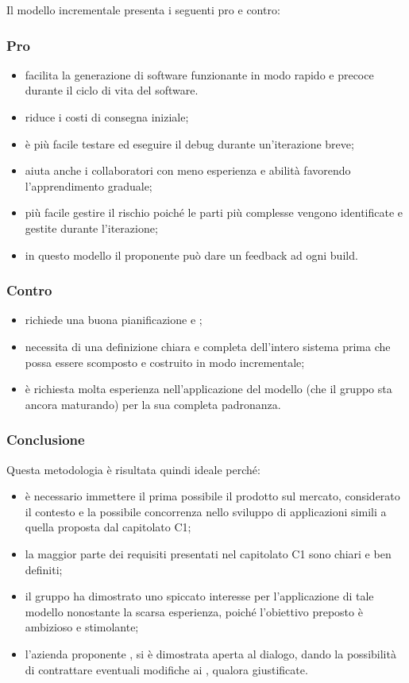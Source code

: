 Il modello incrementale presenta i seguenti pro e contro:\\
\subsubsection{Pro}
\begin{itemize}
    \item facilita la generazione di software funzionante in modo rapido e precoce durante il ciclo di vita del software.
    \item riduce i costi di consegna iniziale;
    \item è più facile testare ed eseguire il debug durante un'iterazione breve;
    \item aiuta anche i collaboratori con meno esperienza e abilità favorendo l'apprendimento graduale;
    \item più facile gestire il rischio poiché le parti più complesse vengono identificate e gestite durante l'iterazione;
    \item in questo modello il proponente può dare un feedback ad ogni build.
\end{itemize}

\subsubsection{Contro}
\begin{itemize}
    \item richiede una buona pianificazione e ;
    \item necessita di una definizione chiara e completa dell'intero sistema prima che possa essere scomposto e costruito in modo incrementale;
    \item è richiesta molta esperienza nell'applicazione del modello (che il gruppo sta ancora maturando) per la sua completa padronanza.
\end{itemize}

\subsubsection{Conclusione}
Questa metodologia è risultata quindi ideale perché:
\begin{itemize}
    \item è necessario immettere il prima possibile il prodotto sul mercato, considerato il contesto e la possibile concorrenza nello sviluppo di applicazioni simili a quella proposta dal capitolato C1;
    \item la maggior parte dei requisiti presentati nel capitolato C1 sono chiari e ben definiti;
    \item il gruppo ha dimostrato uno spiccato interesse per l'applicazione di tale modello nonostante la scarsa esperienza, poiché l'obiettivo preposto è ambizioso e stimolante;
    \item l'azienda proponente \proponente{}, si è dimostrata aperta al dialogo, dando la possibilità di contrattare eventuali modifiche ai , qualora giustificate.
\end{itemize}
